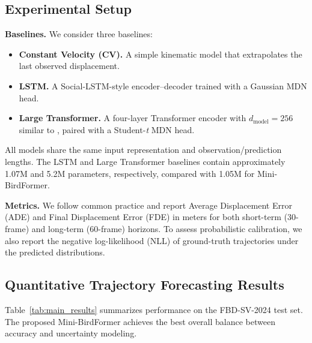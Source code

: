 \documentclass[journal]{IEEEtran}
\begin{document}
\subsection{Experimental Setup}

\textbf{Baselines.} We consider three baselines:

\begin{itemize}
	\item \textbf{Constant Velocity (CV).} A simple kinematic model that extrapolates the last observed displacement.
	\item \textbf{LSTM.} A Social-LSTM-style encoder--decoder \cite{Alahi2016SocialLSTM} trained with a Gaussian MDN head.
	\item \textbf{Large Transformer.} A four-layer Transformer encoder with $d_{\text{model}} = 256$ similar to \cite{Giuliari2021Transformer}, paired with a Student-\textit{t} MDN head.
\end{itemize}

All models share the same input representation and observation/prediction lengths. The LSTM and Large Transformer baselines contain approximately 1.07M and 5.2M parameters, respectively, compared with 1.05M for Mini-BirdFormer.

\textbf{Metrics.} We follow common practice and report Average Displacement Error (ADE) and Final Displacement Error (FDE) in meters for both short-term (30-frame) and long-term (60-frame) horizons. To assess probabilistic calibration, we also report the negative log-likelihood (NLL) of ground-truth trajectories under the predicted distributions.

\subsection{Quantitative Trajectory Forecasting Results}

Table~\ref{tab:main_results} summarizes performance on the FBD-SV-2024 test set. The proposed Mini-BirdFormer achieves the best overall balance between accuracy and uncertainty modeling.
\end{document}
